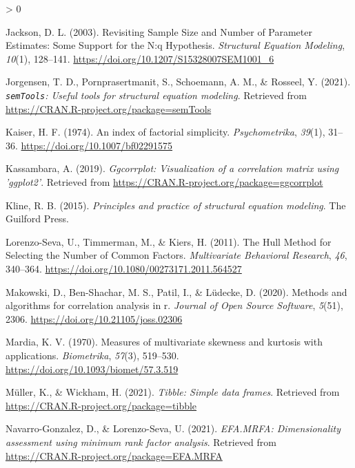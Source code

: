 \documentclass[
  english,
  man]{apa6}
\newlength{\cslhangindent}
\newenvironment{CSLReferences}[2] %
 {%
  \setlength{\parindent}{0pt}
  \ifodd #1 \everypar{\setlength{\hangindent}{\cslhangindent}}\ignorespaces\fi
  \ifnum #2 > 0
  \setlength{\parskip}{#2\baselineskip}
  \fi
 }%
 {}
\begin{document}
\begin{CSLReferences}{1}{0}
\leavevmode\hypertarget{ref-jacksonRevisitingSampleSize2003}{}%
Jackson, D. L. (2003). Revisiting {Sample Size} and {Number} of {Parameter Estimates}: {Some Support} for the {N}:q {Hypothesis}. \emph{Structural Equation Modeling}, \emph{10}(1), 128--141. \url{https://doi.org/10.1207/S15328007SEM1001_6}

\leavevmode\hypertarget{ref-R-semTools}{}%
Jorgensen, T. D., Pornprasertmanit, S., Schoemann, A. M., \& Rosseel, Y. (2021). \emph{\texttt{semTools}: {U}seful tools for structural equation modeling}. Retrieved from \url{https://CRAN.R-project.org/package=semTools}

\leavevmode\hypertarget{ref-kaiserIndexFactorialSimplicity1974}{}%
Kaiser, H. F. (1974). An index of factorial simplicity. \emph{Psychometrika}, \emph{39}(1), 31--36. \url{https://doi.org/10.1007/bf02291575}

\leavevmode\hypertarget{ref-R-ggcorrplot}{}%
Kassambara, A. (2019). \emph{Ggcorrplot: Visualization of a correlation matrix using 'ggplot2'}. Retrieved from \url{https://CRAN.R-project.org/package=ggcorrplot}

\leavevmode\hypertarget{ref-klinePrinciplesPracticeStructural2015}{}%
Kline, R. B. (2015). \emph{Principles and practice of structural equation modeling}. {The Guilford Press}.

\leavevmode\hypertarget{ref-lorenzo-sevaHullMethodSelecting2011}{}%
Lorenzo-Seva, U., Timmerman, M., \& Kiers, H. (2011). The {Hull Method} for {Selecting} the {Number} of {Common Factors}. \emph{Multivariate Behavioral Research}, \emph{46}, 340--364. \url{https://doi.org/10.1080/00273171.2011.564527}

\leavevmode\hypertarget{ref-R-correlation}{}%
Makowski, D., Ben-Shachar, M. S., Patil, I., \& Lüdecke, D. (2020). Methods and algorithms for correlation analysis in r. \emph{Journal of Open Source Software}, \emph{5}(51), 2306. \url{https://doi.org/10.21105/joss.02306}

\leavevmode\hypertarget{ref-mardiaMeasuresMultivariateSkewness1970}{}%
Mardia, K. V. (1970). Measures of multivariate skewness and kurtosis with applications. \emph{Biometrika}, \emph{57}(3), 519--530. \url{https://doi.org/10.1093/biomet/57.3.519}

\leavevmode\hypertarget{ref-R-tibble}{}%
Müller, K., \& Wickham, H. (2021). \emph{Tibble: Simple data frames}. Retrieved from \url{https://CRAN.R-project.org/package=tibble}

\leavevmode\hypertarget{ref-R-EFA.MRFA}{}%
Navarro-Gonzalez, D., \& Lorenzo-Seva, U. (2021). \emph{EFA.MRFA: Dimensionality assessment using minimum rank factor analysis}. Retrieved from \url{https://CRAN.R-project.org/package=EFA.MRFA}


\end{CSLReferences}
\end{document}
